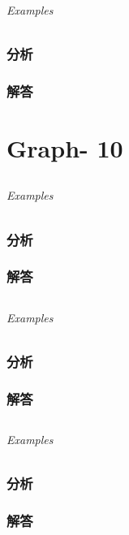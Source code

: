 \documentclass[UTF8,a4paper,12pt]{ctexbook}
\begin{document}
	\subparagraph{Examples}
	
	\subsection{分析}
	
	\subsection{解答}
\chapter{Graph- 10}
\section{}
	
	\subparagraph{Examples}
	
	\subsection{分析}
	
	\subsection{解答}
	
\section{}
	
	\subparagraph{Examples}
	
	\subsection{分析}
	
	\subsection{解答}
	
\section{}
	
	\subparagraph{Examples}
	
	\subsection{分析}
	
	\subsection{解答}
	
\end{document}
